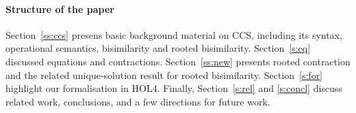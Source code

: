 

\paragraph{Structure of the paper} 
Section~\ref{ss:ccs} presens basic background material on CCS,
including its syntax, operational semantics, bisimilarity and rooted
bisimilarity. Section~\ref{s:eq} discussed equations and contractions.
 Section~\ref{ss:new} presents rooted contraction and the related
 unique-solution result for rooted bisimilarity. Section~\ref{s:for}
 highlight our formalisation in HOL4. Finally,  Section~\ref{s:rel} and
 \ref{s:concl} discuss related work, conclusions,  and  a few
 directions for future work.